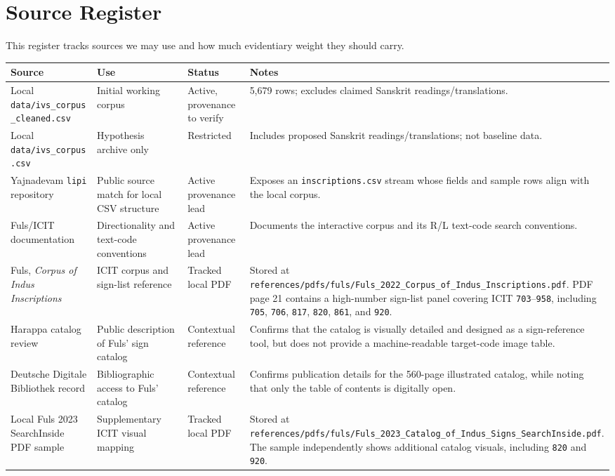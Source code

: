 \section{Source Register}

This register tracks sources we may use and how much evidentiary weight they should carry.

\begin{longtable}{p{}p{}p{}p{}}
\toprule
\textbf{Source} & \textbf{Use} & \textbf{Status} & \textbf{Notes} \\
\midrule
\endhead
Local \texttt{data/ivs\_corpus\_cleaned.csv} & Initial working corpus & Active, provenance to verify & 5,679 rows; excludes claimed Sanskrit readings/translations. \\
Local \texttt{data/ivs\_corpus.csv} & Hypothesis archive only & Restricted & Includes proposed Sanskrit readings/translations; not baseline data. \\
Yajnadevam \texttt{lipi} repository \citep{yajnadevamLipi} & Public source match for local CSV structure & Active provenance lead & Exposes an \texttt{inscriptions.csv} stream whose fields and sample rows align with the local corpus. \\
Fuls/ICIT documentation \citep{fulsICIT} & Directionality and text-code conventions & Active provenance lead & Documents the interactive corpus and its R/L text-code search conventions. \\
Fuls, \emph{Corpus of Indus Inscriptions} \citep{fuls2022corpus} & ICIT corpus and sign-list reference & Tracked local PDF & Stored at \texttt{references/pdfs/fuls/Fuls\_2022\_Corpus\_of\_Indus\_Inscriptions.pdf}. PDF page 21 contains a high-number sign-list panel covering ICIT \texttt{703}--\texttt{958}, including \texttt{705}, \texttt{706}, \texttt{817}, \texttt{820}, \texttt{861}, and \texttt{920}. \\
Harappa catalog review \citep{harappaCatalog2026} & Public description of Fuls' sign catalog & Contextual reference & Confirms that the catalog is visually detailed and designed as a sign-reference tool, but does not provide a machine-readable target-code image table. \\
Deutsche Digitale Bibliothek record \citep{ddbFulsCatalog2026} & Bibliographic access to Fuls' catalog & Contextual reference & Confirms publication details for the 560-page illustrated catalog, while noting that only the table of contents is digitally open. \\
Local Fuls 2023 SearchInside PDF sample & Supplementary ICIT visual mapping & Tracked local PDF & Stored at \texttt{references/pdfs/fuls/Fuls\_2023\_Catalog\_of\_Indus\_Signs\_SearchInside.pdf}. The sample independently shows additional catalog visuals, including \texttt{820} and \texttt{920}. \\

\end{longtable}
